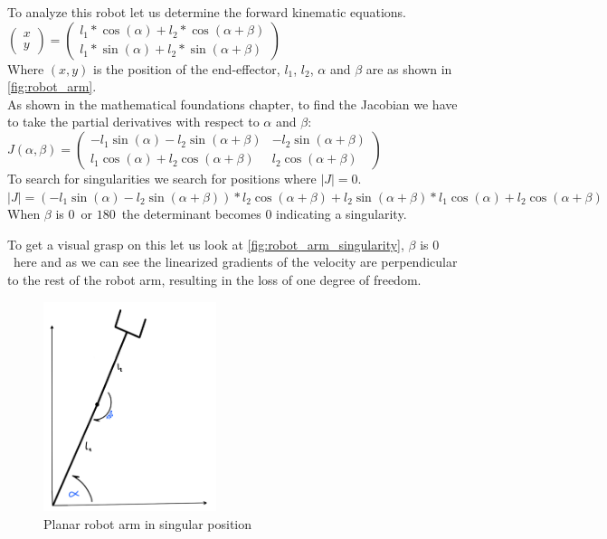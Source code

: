 \documentclass[journal]{IEEEtran}
\begin{document}
To analyze this robot let us determine the forward kinematic equations.\\
$\begin{pmatrix}
  x \\ y
\end{pmatrix} = \begin{pmatrix}
  l_1 * \cos(\alpha) + l_2 * \cos(\alpha + \beta)\\
  l_1 * \sin(\alpha) + l_2 * \sin(\alpha + \beta)
\end{pmatrix}$\\
Where $(x, y)$ is the position of the end-effector, $l_1$, $l_2$, $\alpha$ and $\beta$ are as shown in \autoref{fig:robot_arm}.\\
As shown in the mathematical foundations chapter, to find the Jacobian we have to take the partial derivatives with respect to $\alpha$ and $\beta$:\\
$J(\alpha, \beta) = \begin{pmatrix}
  -l_1 \sin(\alpha) - l_2 \sin(\alpha + \beta) & -l_2 \sin(\alpha + \beta)\\
  l_1 \cos(\alpha) + l_2 \cos(\alpha + \beta) & l_2 \cos(\alpha + \beta)
\end{pmatrix}$\\
To search for singularities we search for positions where $|J| = 0$.\\
$|J| = (-l_1 \sin(\alpha) - l_2 \sin(\alpha + \beta)) * l_2 \cos(\alpha + \beta) + l_2 \sin(\alpha + \beta) * l_1 \cos(\alpha) + l_2 \cos(\alpha + \beta)$\\
When $\beta$ is $0$\textdegree \ or $180$\textdegree \ the determinant becomes 0 indicating a singularity.

To get a visual grasp on this let us look at \autoref{fig:robot_arm_singularity}, $\beta$ is $0$\textdegree \ here and as we can see the linearized gradients of the velocity are perpendicular to the rest of the robot arm, resulting in the loss of one degree of freedom.

\begin{figure}[H]
    \centering
    \includegraphics[width=0.45\textwidth]{images/robot_arm_singularity.png}
    \caption{Planar robot arm in singular position}
    \label{fig:robot_arm_singularity}
\end{figure}
\end{document}
